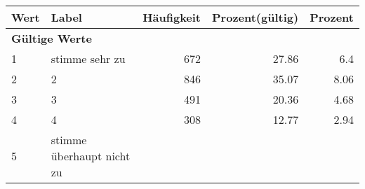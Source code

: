      \begin{longtable}{lXrrr}
     \toprule
     \textbf{Wert} & \textbf{Label} & \textbf{Häufigkeit} & \textbf{Prozent(gültig)} & \textbf{Prozent} \\
     \endhead
     \midrule
     \multicolumn{5}{l}{\textbf{Gültige Werte}}\\

     1 &
     \multicolumn{1}{X}{ stimme sehr zu   } &


       \num{672} &
       \num[round-mode=places,round-precision=2]{27,86} &
         \num[round-mode=places,round-precision=2]{6,4} \\

     2 &
     \multicolumn{1}{X}{ 2   } &


       \num{846} &
       \num[round-mode=places,round-precision=2]{35,07} &
         \num[round-mode=places,round-precision=2]{8,06} \\

     3 &
     \multicolumn{1}{X}{ 3   } &


       \num{491} &
       \num[round-mode=places,round-precision=2]{20,36} &
         \num[round-mode=places,round-precision=2]{4,68} \\

     4 &
     \multicolumn{1}{X}{ 4   } &


       \num{308} &
       \num[round-mode=places,round-precision=2]{12,77} &
         \num[round-mode=places,round-precision=2]{2,94} \\

     5 &
     \multicolumn{1}{X}{ stimme überhaupt nicht zu   } &



\end{longtable}
